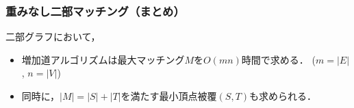 \documentclass[14pt,aspectratio=169,xcolor=dvipsnames,table,onlytextwidth,dvipdfmx]{beamer}
\begin{document}
\begin{frame}
    \frametitle{重みなし二部マッチング（まとめ）}

    \begin{theorem}
        二部グラフにおいて，
        \begin{itemize}
            \setlength{\itemsep}{1em}
            \item 増加道アルゴリズムは最大マッチング$M$を$O(mn)$時間で求める． \hfill {\footnotesize ($m = |E|$, $n = |V|$)}

            \item 同時に，$|M| = |S| + |T|$を満たす最小頂点被覆$(S,T)$も求められる．
        \end{itemize}
    \end{theorem}
\end{frame}

\end{document}
